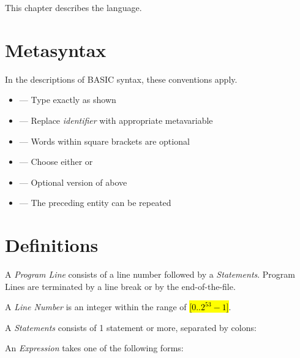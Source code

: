 \newcommand{\intrange}{\hl{[$0..2^{53}-1$]}}

This chapter describes the \tbas{} language.

\section{Metasyntax}

In the descriptions of BASIC syntax, these conventions apply.

\begin{itemize}
\item {} --- Type exactly as shown
\item {} --- Replace \emph{identifier} with appropriate metavariable
\item \code{[a]} --- Words within square brackets are optional
\item {} --- Choose either  or 
\item \code{[a|b]} --- Optional version of above
\item {} --- The preceding entity can be repeated
\end{itemize}

\section{Definitions}

A \emph{Program Line} consists of a line number followed by a \emph{Statements}. Program Lines are terminated by a line break or by the end-of-the-file.

A \emph{Line Number} is an integer within the range of \intrange{}.

A \emph{Statements} consists of 1 statement or more, separated by colons:


An \emph{Expression} takes one of the following forms:

\\
\\
\\
\\
\\
\\

